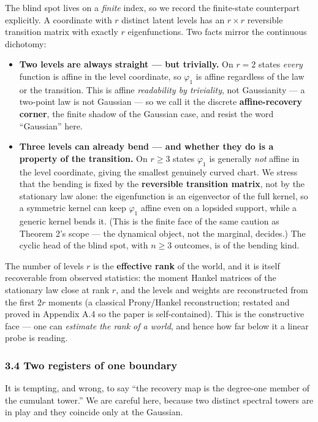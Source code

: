 \documentclass[
  letterpaper,
  11pt]{article}
\providecommand{\tightlist}{%
  \setlength{\itemsep}{0pt}\setlength{\parskip}{0pt}}
\theoremstyle{plain}
\theoremstyle{definition}
\theoremstyle{remark}
\begin{document}
The blind spot lives on a \emph{finite} index, so we record the finite-state counterpart explicitly. A coordinate with \(r\) distinct latent levels has an \(r\times r\) reversible transition matrix with exactly \(r\) eigenfunctions. Two facts mirror the continuous dichotomy:

\begin{itemize}
\tightlist
\item
  \textbf{Two levels are always straight --- but trivially.} On \(r=2\) states \emph{every} function is affine in the level coordinate, so \(\varphi_1\) is affine regardless of the law or the transition. This is affine \emph{readability by triviality}, not Gaussianity --- a two-point law is not Gaussian --- so we call it the discrete \textbf{affine-recovery corner}, the finite shadow of the Gaussian case, and resist the word ``Gaussian'' here.
\item
  \textbf{Three levels can already bend --- and whether they do is a property of the transition.} On \(r\ge 3\) states \(\varphi_1\) is generally \emph{not} affine in the level coordinate, giving the smallest genuinely curved chart. We stress that the bending is fixed by the \textbf{reversible transition matrix}, not by the stationary law alone: the eigenfunction is an eigenvector of the full kernel, so a symmetric kernel can keep \(\varphi_1\) affine even on a lopsided support, while a generic kernel bends it. (This is the finite face of the same caution as Theorem 2's scope --- the dynamical object, not the marginal, decides.) The cyclic head of the blind spot, with \(n\ge 3\) outcomes, is of the bending kind.
\end{itemize}

The number of levels \(r\) is the \textbf{effective rank} of the world, and it is itself recoverable from observed statistics: the moment Hankel matrices of the stationary law close at rank \(r\), and the levels and weights are reconstructed from the first \(2r\) moments (a classical Prony/Hankel reconstruction; restated and proved in Appendix A.4 so the paper is self-contained). This is the constructive face --- one can \emph{estimate the rank of a world}, and hence how far below it a linear probe is reading.

\subsubsection{3.4 Two registers of one boundary}\label{sec:registers}

It is tempting, and wrong, to say ``the recovery map is the degree-one member of the cumulant tower.'' We are careful here, because two distinct spectral towers are in play and they coincide only at the Gaussian.
\end{document}
